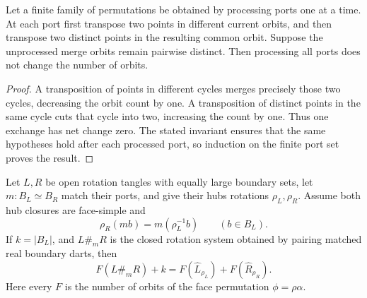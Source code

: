 \begin{lemma}
\label{lem:orbit-exchange}
Let a finite family of permutations be obtained by processing ports one at
a time.  At each port first transpose two points in different current
orbits, and then transpose two distinct points in the resulting common
orbit.  Suppose the unprocessed merge orbits remain pairwise distinct.
Then processing all ports does not change the number of orbits.
\end{lemma}

\begin{proof}
A transposition of points in different cycles merges precisely those two
cycles, decreasing the orbit count by one.  A transposition of distinct
points in the same cycle cuts that cycle into two, increasing the count by
one.  Thus one exchange has net change zero.  The stated invariant ensures
that the same hypotheses hold after each processed port, so induction on the
finite port set proves the result.
\end{proof}

\begin{theorem}
\label{thm:hub-seam-face-formula}
Let \(L,R\) be open rotation tangles with equally large boundary sets,
let \(m:B_L\simeq B_R\) match their ports, and give their hubs rotations
\(\rho_L,\rho_R\).  Assume both hub closures are face-simple and
\[
             \rho_R(mb)=m(\rho_L^{-1}b)
             \qquad(b\in B_L).                 \tag{25}
\]
If \(k=|B_L|\), and \(L\#_mR\) is the closed rotation system obtained by
pairing matched real boundary darts, then
\[
 F(L\#_mR)+k=F(\widehat L_{\rho_L})+
                    F(\widehat R_{\rho_R}).    \tag{26}
\]
Here every \(F\) is the number of orbits of the face permutation
\(\phi=\rho\alpha\).
\end{theorem}

